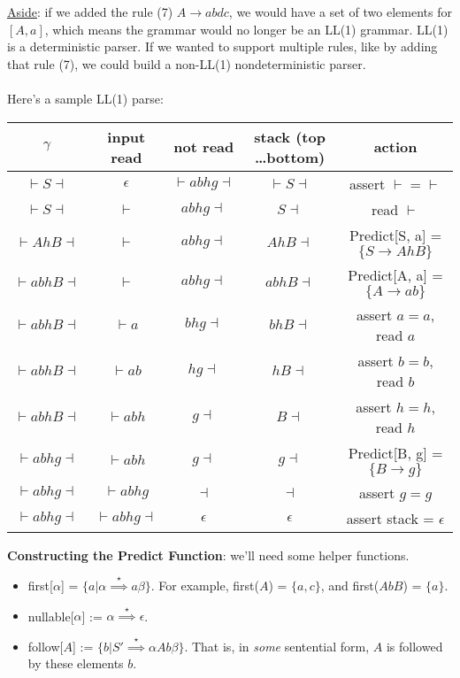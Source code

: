 \documentclass[]{article}
\theoremstyle{definition}
\begin{document}
				\underline{Aside}: if we added the rule (7) $A \to abdc$, we would have a set of two elements for $[A, a]$, which means the grammar would no longer be an LL(1) grammar. LL(1) is a deterministic parser. If we wanted to support multiple rules, like by adding that rule (7), we could build a non-LL(1) nondeterministic parser. 
				\\ \\
				Here's a sample LL(1) parse:
				\begin{center}
					\begin{tabular}{|c|c|c|c|c|}
						\hline
						$\gamma$ & input read & not read & stack (top \ldots bottom) & action \\ \hline
						$\vdash S \dashv$ & $\epsilon$ & $\vdash abhg \dashv$ & $\vdash S \dashv$ & assert $\vdash = \vdash$ \\
						$\vdash S \dashv$ & $\vdash$ & $abhg \dashv$ & $S \dashv$ & read $\vdash$ \\
						$\vdash AhB \dashv$ & $\vdash$ & $abhg \dashv$ & $AhB \dashv$ & Predict[S, a] = $\{S \to AhB\}$ \\
						$\vdash abhB \dashv$ & $\vdash$ & $abhg \dashv$ & $abhB \dashv$ & Predict[A, a] = $\{A \to ab\}$ \\
						$\vdash abhB \dashv$ & $\vdash a$ & $bhg \dashv$ & $bhB \dashv$ & assert $a = a$, read $a$ \\
						$\vdash abhB \dashv$ & $\vdash ab$ & $hg \dashv$ & $hB \dashv$ & assert $b = b$, read $b$ \\
						$\vdash abhB \dashv$ & $\vdash abh$ & $g \dashv$ & $B \dashv$ & assert $h = h$, read $h$ \\
						$\vdash abhg \dashv$ & $\vdash abh$ & $g \dashv$ & $g \dashv$ & Predict[B, g] = $\{B \to g\}$ \\
						$\vdash abhg \dashv$ & $\vdash abhg$ & $\dashv$ & $\dashv$ & assert $g = g$ \\
						$\vdash abhg \dashv$ & $\vdash abhg \dashv$ & $\epsilon$ & $\epsilon$ & assert stack = $\epsilon$ \\ \hline
					\end{tabular}
				\end{center}
	

				\textbf{Constructing the Predict Function}: we'll need some helper functions.
				\begin{itemize}
					\item first[$\alpha$] = $\{a | \alpha \stackrel{\star}{\implies} a \beta\}$. For example, first($A$) = $\{a, c\}$, and first($AbB$) = $\{a\}$.
					\item nullable[$\alpha$] := $\alpha \stackrel{\star}{\implies} \epsilon$.
					\item follow[$A$] := $\{b | S' \stackrel{\star}{\implies} \alpha A b \beta\}$. That is, in \emph{some} sentential form, $A$ is followed by these elements $b$.
				\end{itemize}
\end{document}
